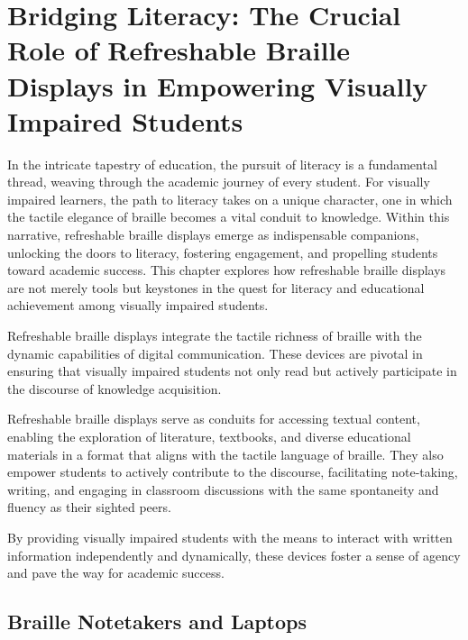 \chapter{Bridging Literacy: The Crucial Role of Refreshable Braille Displays in Empowering Visually Impaired Students}\label{braille-first-devices}

In the intricate tapestry of education, the pursuit of literacy is a fundamental thread, weaving through the academic journey of every student. For visually impaired learners, the path to literacy takes on a unique character, one in which the tactile elegance of braille becomes a vital conduit to knowledge. Within this narrative, refreshable braille displays emerge as indispensable companions, unlocking the doors to literacy, fostering engagement, and propelling students toward academic success. This chapter explores how refreshable braille displays are not merely tools but keystones in the quest for literacy and educational achievement among visually impaired students.

Refreshable braille displays integrate the tactile richness of braille with the dynamic capabilities of digital communication. These devices are pivotal in ensuring that visually impaired students not only read but actively participate in the discourse of knowledge acquisition.

Refreshable braille displays serve as conduits for accessing textual content, enabling the exploration of literature, textbooks, and diverse educational materials in a format that aligns with the tactile language of braille. They also empower students to actively contribute to the discourse, facilitating note-taking, writing, and engaging in classroom discussions with the same spontaneity and fluency as their sighted peers.

By providing visually impaired students with the means to interact with written information independently and dynamically, these devices foster a sense of agency and pave the way for academic success.

\section{Braille Notetakers and Laptops}\label{braille-notetakers-and-braille-laptop-computers}

